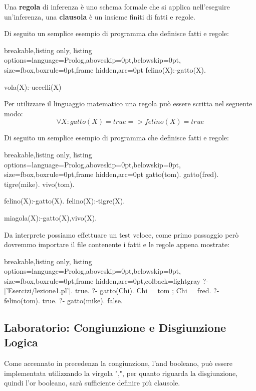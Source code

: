 Una \textbf{regola} di inferenza è uno schema formale che si applica nell'eseguire un'inferenza, una \textbf{clausola} è un insieme finiti di fatti e regole.

Di seguito un semplice esempio di programma che definisce fatti e regole:
\begin{tcblisting}{breakable,listing only,
  listing options={language=Prolog,aboveskip=0pt,belowskip=0pt},
  size=fbox,boxrule=0pt,frame hidden,arc=0pt}
felino(X):-gatto(X).

vola(X):-uccelli(X)
\end{tcblisting}

Per utilizzare il linguaggio matematico una regola può essere scritta nel seguente modo:
\begin{displaymath}
\forall X : gatto(X) = true => felino(X) = true
\end{displaymath}

Di seguito un semplice esempio di programma che definisce fatti e regole:
\begin{tcblisting}{breakable,listing only,
  listing options={language=Prolog,aboveskip=0pt,belowskip=0pt},
  size=fbox,boxrule=0pt,frame hidden,arc=0pt}
gatto(tom).
gatto(fred).
tigre(mike).
vivo(tom).

felino(X):-gatto(X).
felino(X):-tigre(X).

miagola(X):-gatto(X),vivo(X).
\end{tcblisting}

Da interprete possiamo effettuare un test veloce, come primo passaggio però dovremmo importare il file contenente i fatti e le regole appena mostrate:

\begin{tcblisting}{breakable,listing only,
  listing options={language=Prolog,aboveskip=0pt,belowskip=0pt},
  size=fbox,boxrule=0pt,frame hidden,arc=0pt,colback=lightgray}
?- ['Esercizi/lezione1.pl'].
true.
?- gatto(Chi).
Chi = tom ;
Chi = fred.
?- felino(tom). %
true.
?- gatto(mike). 
false.
\end{tcblisting}

\subsection{Laboratorio: Congiunzione e Disgiunzione Logica}
Come accennato in precedenza la congiunzione, l'and booleano, può essere implementata utilizzando la virgola ",", per quanto riguarda la disgiunzione, quindi l'or booleano, sarà sufficiente definire più clausole.

